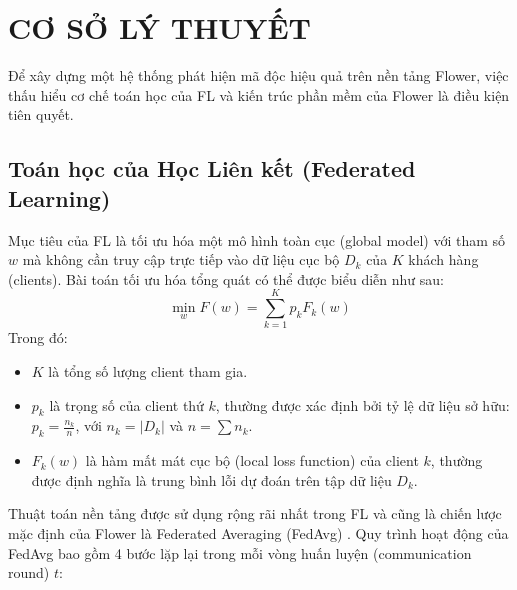 \section{CƠ SỞ LÝ THUYẾT}

Để xây dựng một hệ thống phát hiện mã độc hiệu quả trên nền tảng Flower, việc thấu hiểu cơ chế toán học của FL và kiến trúc phần mềm của Flower là điều kiện tiên quyết.

\subsection{Toán học của Học Liên kết (Federated Learning)}
Mục tiêu của FL là tối ưu hóa một mô hình toàn cục (global model) với tham số $w$ mà không cần truy cập trực tiếp vào dữ liệu cục bộ $D_k$ của $K$ khách hàng (clients). Bài toán tối ưu hóa tổng quát có thể được biểu diễn như sau:
$$\min_{w} F(w) = \sum_{k=1}^{K} p_k F_k(w)$$
Trong đó:
\begin{itemize}
    \item $K$ là tổng số lượng client tham gia.
    \item $p_k$ là trọng số của client thứ $k$, thường được xác định bởi tỷ lệ dữ liệu sở hữu: $p_k = \frac{n_k}{n}$, với $n_k = |D_k|$ và $n = \sum n_k$.
    \item $F_k(w)$ là hàm mất mát cục bộ (local loss function) của client $k$, thường được định nghĩa là trung bình lỗi dự đoán trên tập dữ liệu $D_k$.
\end{itemize}

Thuật toán nền tảng được sử dụng rộng rãi nhất trong FL và cũng là chiến lược mặc định của Flower là Federated Averaging (FedAvg) \cite{mcmahan2017communication}. Quy trình hoạt động của FedAvg bao gồm 4 bước lặp lại trong mỗi vòng huấn luyện (communication round) $t$:

